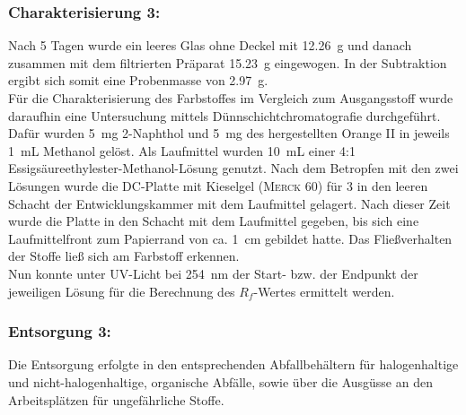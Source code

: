 \subsubsection*{Charakterisierung 3:}
Nach 5 Tagen wurde ein leeres Glas ohne Deckel mit \SI{12,26}{\gram} und danach zusammen mit dem filtrierten Präparat \SI{15,23}{\gram} eingewogen. In der Subtraktion ergibt sich somit eine Probenmasse von \SI{2,97}{\gram}. \\
Für die Charakterisierung des Farbstoffes im Vergleich zum Ausgangsstoff wurde daraufhin eine Untersuchung mittels Dünnschichtchromatografie durchgeführt. Dafür wurden \SI{5}{\milli \gram} 2-Naphthol und \SI{5}{\milli \gram} des hergestellten Orange II in jeweils \SI{1}{\milli \liter} Methanol gelöst. Als Laufmittel wurden \SI{10}{\milli \liter } einer 4:1 Essigsäureethylester-Methanol-Lösung genutzt. Nach dem Betropfen mit den zwei Lösungen wurde die DC-Platte mit Kieselgel (\textsc{Merck} 60) für \SI{3}{\min} in den leeren Schacht der Entwicklungskammer mit dem Laufmittel gelagert. Nach dieser Zeit wurde die Platte in den Schacht mit dem Laufmittel gegeben, bis sich eine Laufmittelfront zum Papierrand von ca. \SI{1}{\centi \meter} gebildet hatte. Das Fließverhalten der Stoffe ließ sich am Farbstoff erkennen.\\
Nun konnte unter UV-Licht bei \SI{254}{\nano\meter} der Start- bzw. der Endpunkt der jeweiligen Lösung für die Berechnung des $R_f$-Wertes ermittelt werden. 

\subsubsection*{Entsorgung 3:}
Die Entsorgung erfolgte in den entsprechenden Abfallbehältern für halogenhaltige und nicht-halogenhaltige, organische Abfälle, sowie über die Ausgüsse an den Arbeitsplätzen für ungefährliche Stoffe.